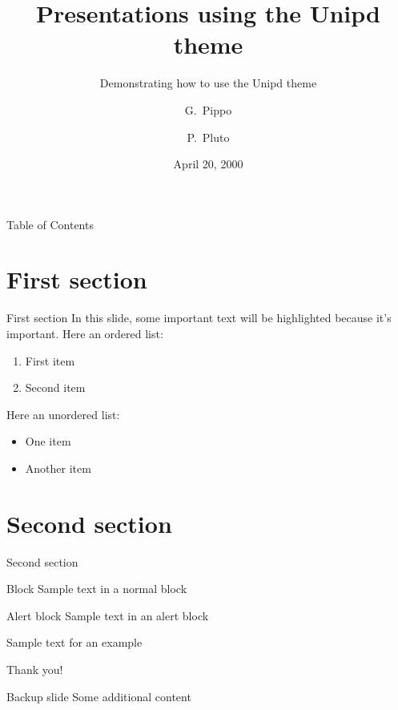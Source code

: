\documentclass[aspectratio=169]{beamer}
\title{Presentations using the Unipd theme}
\subtitle{Demonstrating how to use the Unipd theme}
\author[Pippo, Pluto]{G.~Pippo \and P.~Pluto}
\date{April 20, 2000}
\begin{document}
\frame{\titlepage}

\begin{frame}{Table of Contents}
    \tableofcontents    
\end{frame}

\section{First section}

    \begin{frame}{First section}
        In this slide, some important text will be
        \alert{highlighted} because it's important.
        Here an ordered list:
        \begin{enumerate}
            \item First item
            \item Second item
        \end{enumerate}
        Here an unordered list: 
        \begin{itemize}
            \item One item
            \item Another item
        \end{itemize}
    \end{frame}
    
\section{Second section}

    \begin{frame}{Second section}
        \begin{block}{Block}
            Sample text in a normal block
        \end{block}
   
        \begin{alertblock}{Alert block}
            Sample text in an alert block
        \end{alertblock}    
        
         \begin{example}
            Sample text for an example
        \end{example}
    \end{frame}

    
    \begin{emptyframe}
        Thank you!
    \end{emptyframe}

    \appendix

    \begin{frame}{Backup slide}
        Some additional content
    \end{frame}
    
\end{document}
